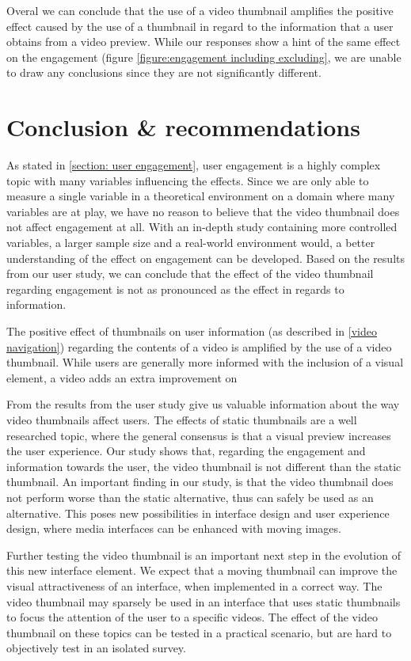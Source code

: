 \documentclass{../resources/sig-alternate-05-2015}
\begin{document}
Overal we can conclude that the use of a video thumbnail amplifies the positive effect caused by the use of a thumbnail in regard to the information that a user obtains from a video preview. While our responses show a hint of the same effect on the engagement (figure \ref{figure:engagement including excluding}, we are unable to draw any conclusions since they are not significantly different.

\section{Conclusion \& recommendations}

As stated in \ref{section: user engagement}, user engagement is a highly complex topic with many variables influencing the effects. Since we are only able to measure a single variable in a theoretical environment on a domain where many variables are at play, we have no reason to believe that the video thumbnail does not affect engagement at all. With an in-depth study containing more controlled variables, a larger sample size and a real-world environment would, a better understanding of the effect on engagement can be developed. Based on the results from our user study, we can conclude that the effect of the video thumbnail regarding engagement is not as pronounced as the effect in regards to information.

The positive effect of thumbnails on user information (as described in \ref{video navigation}) regarding the contents of a video is amplified by the use of a video thumbnail. While users are generally more informed with the inclusion of a visual element, a video adds an extra improvement on 


From the results from the user study give us valuable information about the way video thumbnails affect users. The effects of static thumbnails are a well researched topic, where the general consensus is that a visual preview increases the user experience. Our study shows that, regarding the engagement and information towards the user, the video thumbnail is not different than the static thumbnail. An important finding in our study, is that the video thumbnail does not perform worse than the static alternative, thus can safely be used as an alternative. This poses new possibilities in interface design and user experience design, where media interfaces can be enhanced with moving images.

Further testing the video thumbnail is an important next step in the evolution of this new interface element. We expect that a moving thumbnail can improve the visual attractiveness of an interface, when implemented in a correct way. The video thumbnail may sparsely be used in an interface that uses static thumbnails to focus the attention of the user to a specific videos. The effect of the video thumbnail on these topics can be tested in a practical scenario, but are hard to objectively test in an isolated survey.
\end{document}

